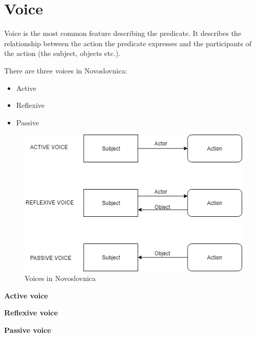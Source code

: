 \section{Voice}

Voice is the most common feature describing the predicate. It describes the relationship between the action the predicate expresses and the participants of the action (the subject, objects etc.).

There are three voices in Novoslovnica:

\begin{itemize}
	\item Active
	\item Reflexive
	\item Passive
\end{itemize}

\begin{figure}
	\includegraphics[width=\linewidth]{./sources/voices.png}
	\caption{Voices in Novoslovnica}
	\label{fig:voices}
\end{figure}

\textbf{Active voice}


\textbf{Reflexive voice}

\textbf{Passive voice}
